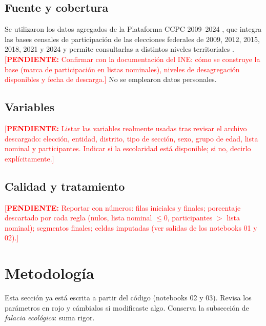 \documentclass[11pt,letterpaper]{article}
\newcommand{\pend}[1]{\textcolor{red}{[\textbf{PENDIENTE:} #1]}}
\begin{document}
\subsection{Fuente y cobertura}
Se utilizaron los datos agregados de la Plataforma CCPC 2009--2024 \cite{ine_ccpc}, que integra las bases censales de participaci\'on de las elecciones federales de 2009, 2012, 2015, 2018, 2021 y 2024 y permite consultarlas a distintos niveles territoriales \cite{ine_rector}. \pend{Confirmar con la documentaci\'on del INE: c\'omo se construye la base (marca de participaci\'on en listas nominales), niveles de desagregaci\'on disponibles y fecha de descarga.} No se emplearon datos personales.

\subsection{Variables}
\pend{Listar las variables realmente usadas tras revisar el archivo descargado: elecci\'on, entidad, distrito, tipo de secci\'on, sexo, grupo de edad, lista nominal y participantes. Indicar si la escolaridad est\'a disponible; si no, decirlo expl\'icitamente.}

\subsection{Calidad y tratamiento}
\pend{Reportar con n\'umeros: filas iniciales y finales; porcentaje descartado por cada regla (nulos, lista nominal $\le 0$, participantes $>$ lista nominal); segmentos finales; celdas imputadas (ver salidas de los notebooks 01 y 02).}

\section{Metodolog\'ia}
\begin{guia}
Esta secci\'on ya est\'a escrita a partir del c\'odigo (notebooks 02 y 03). Revisa los par\'ametros en rojo y c\'ambialos si modificaste algo. Conserva la subsecci\'on de \emph{falacia ecol\'ogica}: suma rigor.
\end{guia}
\end{document}
